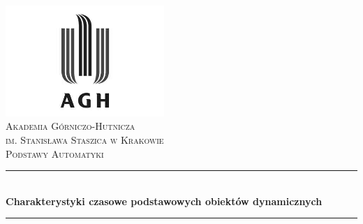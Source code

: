 \begin{titlepage}

\newcommand{\HRule}{\rule{\linewidth}{0.5mm}}

\center
 

\includegraphics[width=6cm]{../res/img/logo.png}\\[1cm]
 
 

\textsc{\LARGE Akademia Górniczo-Hutnicza \\[0.2cm]
im. Stanisława Staszica w Krakowie}\\[1.5cm]

\textsc{\Large Podstawy Automatyki}\\[0.5cm]


\HRule \\[0.4cm]
{ \huge \bfseries Charakterystyki czasowe podstawowych obiektów
dynamicznych}\\[0.4cm]
\HRule \\[1.5cm]
 


\end{titlepage}
